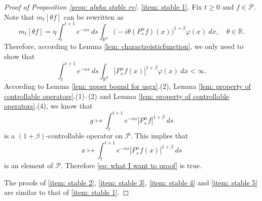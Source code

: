 \documentclass[12pt,a4paper]{amsart}
\theoremstyle{plain}
\theoremstyle{definition}
\numberwithin{equation}{section}
\begin{document}
\begin{proof}[Proof of Proposition \ref{prop: alpha stable rv}]
    \eqref{item: stable 1}.
	Fix $t\geq 0$ and $f\in \mathcal P$.
	Note that $m_t[\theta f]$ can be rewritten as
\[
    m_t[\theta f]
    = \eta \int_t^{t+1}e^{-\alpha s}~ds\int_{\mathbb R^d} \big(-i\theta (P_{s}^\alpha f)(x)\big)^{1+\beta} \varphi(x)~dx,
    \quad \theta \in \mathbb R.
\]
	Therefore, according to Lemma \ref{lem: charactreisticfunction}, we only need to show that
\begin{equation}
\label{eq: what I want to proof}
    \int_t^{t+1}e^{-\alpha s}~ds\int_{\mathbb R^d} | P_{s}^\alpha f(x)|^{1+\beta} \varphi(x)~dx
    < \infty.
\end{equation}
	According to Lemma \ref{lem: upper bound for usgx}.(2), Lemma \ref{lem: property of controllable operators}.(1)--(2) and Lemma \ref{lem: property of controllable operators}.(4),  
    we know that \[ g \mapsto \int_t^{t+1}e^{-\alpha s} |P_{s}^\alpha f|^{1+\beta}~ds\] is a $(1+\beta)$-controllable operator on $\mathcal P$.
    This implies that \[ x \mapsto \int_t^{t+1}e^{-\alpha s} |P_{s}^\alpha f(x)|^{1+\beta}~ds\] is an element of $\mathcal P$.
	Therefore \eqref{eq: what I want to proof} is true.

    The proofs of \eqref{item: stable 2}, \eqref{item: stable 3}, \eqref{item: stable 4} and \eqref{item: stable 5} are similar to that of \eqref{item: stable 1}.
\end{proof}
%
\end{document}
